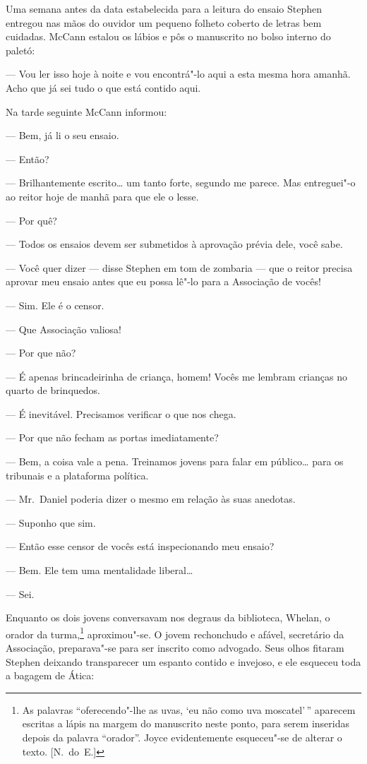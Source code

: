 Uma semana antes da data estabelecida para a leitura do ensaio
Stephen entregou nas mãos do ouvidor um pequeno folheto coberto de
letras bem cuidadas.  McCann estalou os lábios e pôs o manuscrito no
bolso interno do paletó:

--- Vou ler isso hoje à noite e vou encontrá"-lo aqui a esta mesma
hora amanhã.  Acho que já sei tudo o que está contido aqui.

Na tarde seguinte McCann informou:

--- Bem, já li o seu ensaio.

--- Então?

--- Brilhantemente escrito\ldots{} um tanto forte, segundo me parece.
Mas entreguei"-o ao reitor hoje de manhã para que ele o lesse.

--- Por quê?

--- Todos os ensaios devem ser submetidos à aprovação prévia
dele, você sabe.

--- Você quer dizer --- disse Stephen em tom de zombaria --- que o
reitor precisa aprovar meu ensaio antes que eu possa lê"-lo para a
Associação de vocês!

--- Sim.  Ele é o censor.

--- Que Associação valiosa!

--- Por que não?

--- É apenas brincadeirinha de criança, homem!  Vocês me 
lembram crianças no quarto de brinquedos.

--- É inevitável.  Precisamos verificar o que nos chega.

--- Por que não fecham as portas imediatamente?

--- Bem, a coisa vale a pena.  Treinamos jovens para falar em
público\ldots{} para os tribunais e a plataforma política.

--- Mr.~Daniel poderia dizer o mesmo em relação às suas anedotas.

--- Suponho que sim.

--- Então esse censor de vocês está inspecionando meu ensaio?

--- Bem.  Ele tem uma mentalidade liberal\ldots{}

--- Sei.

Enquanto os dois jovens conversavam nos degraus da biblioteca,
Whelan, o orador da turma,\footnote{ As palavras “oferecendo"-lhe as		
uvas, ‘eu não como uva moscatel’\,” aparecem escritas a lápis na margem
do manuscrito neste ponto, para serem inseridas depois da palavra
“orador”.  Joyce evidentemente esqueceu"-se de alterar o texto. [N.~do~E.]}
aproximou"-se.  O jovem rechonchudo e afável, secretário da Associação,
preparava"-se para ser inscrito como advogado.  Seus olhos fitaram
Stephen deixando transparecer um espanto contido e invejoso, e ele
esqueceu toda a bagagem de Ática:

